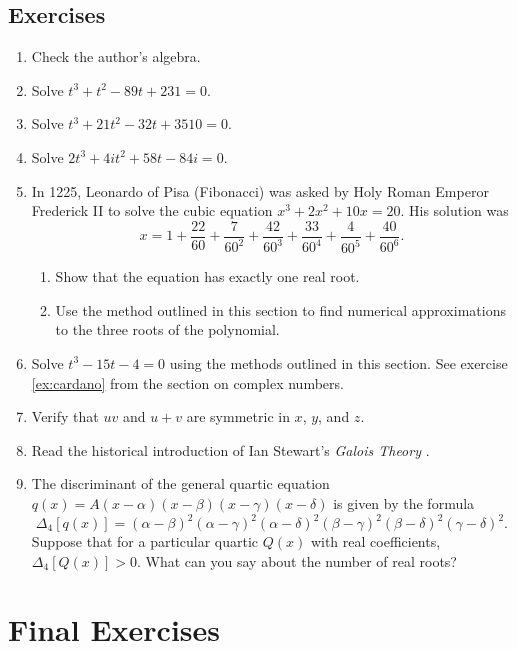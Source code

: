 \documentclass[a4paper,10pt,titlepage]{article}
\theoremstyle{definition}
\newcommand{\harder}{\refstepcounter{enumi}\item[$^{\star\star}$\theenumi.]}
\begin{document}
\subsection*{Exercises}
\begin{enumerate}
  \harder Check the author's algebra.
  \item Solve $ t^3 + t^2 - 89t + 231 = 0 $.
  \item Solve $ t^3 + 21t^2 - 32t + 3510 = 0 $.
  \item Solve $ 2t^3 + 4i t^2 + 58t - 84i = 0 $.
  \item In 1225, Leonardo of Pisa (Fibonacci) was asked by Holy Roman Emperor Frederick II
        to solve the cubic equation $ x^3 + 2x^2 + 10x = 20 $. His solution was
        \begin{displaymath}
          x = 1 + \frac{22}{60} + \frac{7}{60^2} + \frac{42}{60^3} + \frac{33}{60^4} + \frac{4}{60^5} + \frac{40}{60^6}.
        \end{displaymath}
        \begin{enumerate}
          \item Show that the equation has exactly one real root.
          \item Use the method outlined in this section to find numerical approximations to the three roots
                of the polynomial.
        \end{enumerate}
  \item Solve $ t^3 - 15t - 4 = 0 $ using the methods outlined in this section. See exercise \ref{ex:cardano}
        from the section on complex numbers.
  \item Verify that $ uv $ and $ u + v $ are symmetric in $ x $, $ y $, and $ z $.
  \item Read the historical introduction of Ian Stewart's \textit{Galois Theory} \cite{Ste15}.
  \item The discriminant of the general quartic equation $ q(x) = A(x - \alpha)(x - \beta)(x - \gamma)(x - \delta) $ is
        given by the formula
        \begin{displaymath}
          \Delta_4 [q(x)] = (\alpha - \beta)^2(\alpha - \gamma)^2(\alpha - \delta)^2(\beta - \gamma)^2(\beta - \delta)^2(\gamma - \delta)^2.
        \end{displaymath}
        Suppose that for a particular quartic $ Q(x) $ with real coefficients, $ \Delta_4[Q(x)] > 0 $. What can you say about the number of real roots?
\end{enumerate}

\section{Final Exercises}\label{sec:finalexs}
\end{document}
